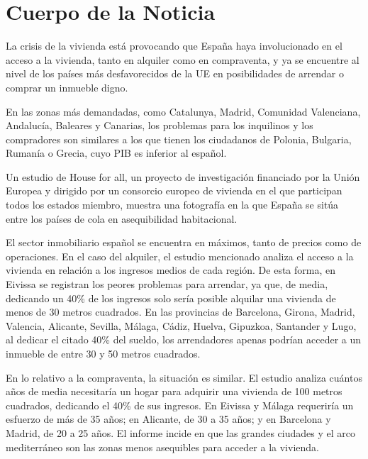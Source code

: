 \documentclass[10pt,a4paper]{article}
\begin{document}
\section*{Cuerpo de la Noticia}
\setlength{\parskip}{1em}
\setlength{\parindent}{0em}
La crisis de la vivienda est\'{a} provocando que Espa\~{n}a haya involucionado en el acceso a la vivienda, tanto en alquiler como en compraventa, y ya se encuentre al nivel de los pa\'{i}ses m\'{a}s desfavorecidos de la UE en posibilidades de arrendar o comprar un inmueble digno.
\par\medskip
En las zonas m\'{a}s demandadas, como Catalunya, Madrid, Comunidad Valenciana, Andaluc\'{i}a, Baleares y Canarias, los problemas para los inquilinos y los compradores son similares a los que tienen los ciudadanos de Polonia, Bulgaria, Ruman\'{i}a o Grecia, cuyo PIB es inferior al espa\~{n}ol.
\par\medskip
Un estudio de House for all, un proyecto de investigaci\'{o}n financiado por la Uni\'{o}n Europea y dirigido por un consorcio europeo de vivienda en el que participan todos los estados miembro, muestra una fotograf\'{i}a en la que Espa\~{n}a se sit\'{u}a entre los pa\'{i}ses de cola en {}asequibilidad{} habitacional.
\par\medskip
El sector inmobiliario espa\~{n}ol se encuentra en m\'{a}ximos, tanto de precios como de operaciones. En el caso del alquiler, el estudio mencionado analiza el acceso a la vivienda en relaci\'{o}n a los ingresos medios de cada regi\'{o}n. De esta forma, en Eivissa se registran los peores problemas para arrendar, ya que, de media, dedicando un 40\% de los ingresos solo ser\'{i}a posible alquilar una vivienda de menos de 30 metros cuadrados. En las provincias de Barcelona, Girona, Madrid, Valencia, Alicante, Sevilla, M\'{a}laga, C\'{a}diz, Huelva, Gipuzkoa, Santander y Lugo, al dedicar el citado 40\% del sueldo, los arrendadores apenas podr\'{i}an acceder a un inmueble de entre 30 y 50 metros cuadrados.
\par\medskip
En lo relativo a la compraventa, la situaci\'{o}n es similar. El estudio analiza cu\'{a}ntos a\~{n}os de media necesitar\'{i}a un hogar para adquirir una vivienda de 100 metros cuadrados, dedicando el 40\% de sus ingresos. En Eivissa y M\'{a}laga requerir\'{i}a un esfuerzo de m\'{a}s de 35 a\~{n}os; en Alicante, de 30 a 35 a\~{n}os; y en Barcelona y Madrid, de 20 a 25 a\~{n}os. El informe incide en que las grandes ciudades y el arco mediterr\'{a}neo son las zonas menos asequibles para acceder a la vivienda.
\par\medskip
\end{document}
